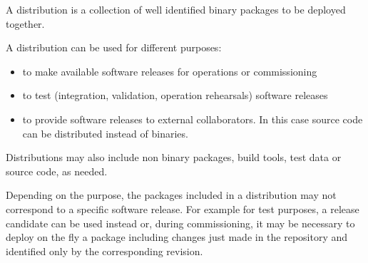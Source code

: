A distribution is a collection of well identified binary packages to be deployed together.

A distribution can be used for different purposes:

\begin{itemize}
\item to make available software releases for operations or commissioning
\item to test (integration, validation, operation rehearsals) software releases
\item to provide software releases to external collaborators. In this case source code can be distributed instead of binaries.
\end{itemize}

Distributions may also include non binary packages, build tools, test data or source code, as needed.

Depending on the purpose, the packages included in a distribution may not correspond to a specific software release. 
For example for test purposes, a release candidate can be used instead or, during commissioning, 
it may be necessary to deploy on the fly a package including changes just made in the repository
and identified only by the corresponding revision.

